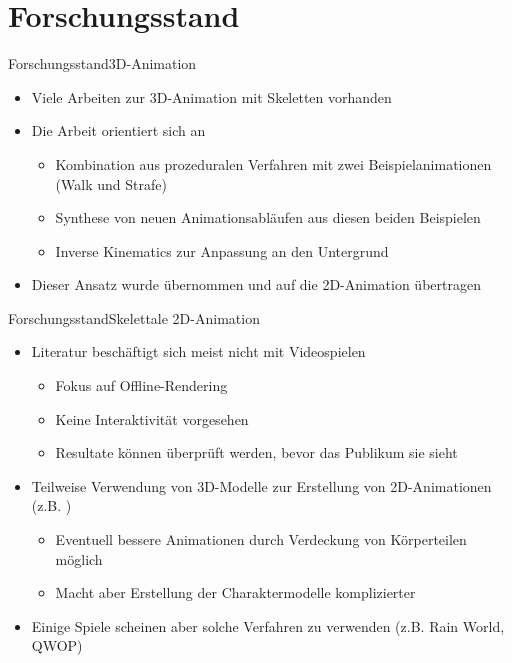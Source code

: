 \documentclass[t,aspectratio=169,divpsnames]{beamer}
\begin{document}
\section{Forschungsstand}
\begin{frame}{Forschungsstand}{3D-Animation}
    \begin{itemize}
        \item Viele Arbeiten zur 3D-Animation mit Skeletten vorhanden %
        \item Die Arbeit orientiert sich an \cite{johansen2009automated}
              \begin{itemize}
                  \item Kombination aus prozeduralen Verfahren mit zwei Beispielanimationen (Walk und Strafe)
                  \item Synthese von neuen Animationsabläufen aus diesen beiden Beispielen
                  \item Inverse Kinematics zur Anpassung an den Untergrund
              \end{itemize}
        \item Dieser Ansatz wurde übernommen und auf die 2D-Animation übertragen
    \end{itemize}
\end{frame}

\begin{frame}{Forschungsstand}{Skelettale 2D-Animation}
    \begin{itemize}
        \item Literatur beschäftigt sich meist nicht mit Videospielen %
              \begin{itemize}
                  \item Fokus auf Offline-Rendering
                  \item Keine Interaktivität vorgesehen
                  \item Resultate können überprüft werden, bevor das Publikum sie sieht
              \end{itemize}
        \item Teilweise Verwendung von 3D-Modelle zur Erstellung von 2D-Animationen (z.B. \cite{pangesti2019analysis}) %
              \begin{itemize}
                  \item Eventuell bessere Animationen durch Verdeckung von Körperteilen möglich
                  \item Macht aber Erstellung der Charaktermodelle komplizierter
              \end{itemize}
        \item Einige Spiele scheinen aber solche Verfahren zu verwenden (z.B. Rain World, QWOP)
    \end{itemize}
\end{frame}
\end{document}
